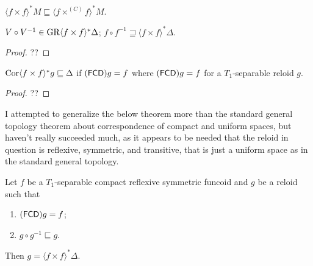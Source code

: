 \begin{cor}
  $\langle f \times f \rangle^{\ast} M \sqsubseteq \langle f \times^{(C)} f
  \rangle^{\ast} M$.
\end{cor}

\begin{cor}
  $V \circ V^{- 1} \in \operatorname{GR} \langle f \times f \rangle^{\ast} \Delta$; $f
  \circ f^{- 1} \sqsupseteq \langle f \times f \rangle^{\ast} \Delta$.
\end{cor}

\begin{proof}
  ??
\end{proof}

\begin{lem}
  $\operatorname{Cor} \langle f \times f \rangle^{\ast} g \sqsubseteq \Delta$ if
  $(\mathsf{FCD}) g = f$ where $(\mathsf{FCD}) g = f$ for a
  $T_1$-separable reloid $g$.
\end{lem}

\begin{proof}
  ??
\end{proof}

\begin{rem}
  I attempted to generalize the below theorem more than the standard general
  topology theorem about correspondence of compact and uniform spaces, but
  haven't really succeeded much, as it appears to be needed that the reloid in
  question is reflexive, symmetric, and transitive, that is just a uniform
  space as in the standard general topology.
\end{rem}

\begin{thm}
  Let $f$ be a $T_1$-separable compact reflexive symmetric funcoid and $g$ be
  a reloid such that
  \begin{enumerate}
    \item $(\mathsf{FCD}) g = f$;
    
    \item $g \circ g^{- 1} \sqsubseteq g$.
  \end{enumerate}
  Then $g = \langle f \times f \rangle^{\ast} \Delta$.
\end{thm}

